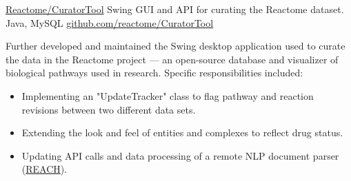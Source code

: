 \showoff
{\textcolor{my-blue}{\href{https://reactome.org/}{Reactome/CuratorTool}}}
{Swing GUI and API for curating the Reactome dataset.}
{Java, MySQL}
{\textcolor{my-blue}{\href{https://github.com/reactome/CuratorTool}{github.com/reactome/CuratorTool}}}

Further developed and maintained the Swing desktop application used to curate the data in the Reactome project — an open-source database and visualizer of biological pathways used in research. Specific responsibilities included:

\begin{itemize}[label=$\triangleright$]
\item Implementing an "UpdateTracker" class to flag pathway and reaction revisions between two different data sets.
\item Extending the look and feel of entities and complexes to reflect drug status.
\item Updating API calls and data processing of a remote NLP document parser (\textcolor{my-blue}{\href{https://github.com/clulab/reach}{REACH}}).
\end{itemize}

